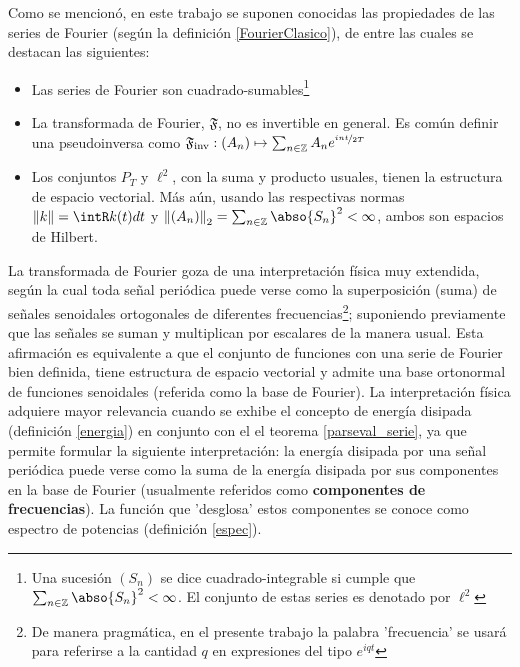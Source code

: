 Como se mencion\'o, en este trabajo se suponen conocidas las propiedades de las series de Fourier 
(seg\'un la definici\'on \ref{FourierClasico}), de entre las cuales se destacan las siguientes:
\begin{itemize}
\item Las series de Fourier  son cuadrado-sumables\footnote{Una sucesi\'on $\left( S_n \right)$ se 
dice cuadrado-integrable si cumple que $\sum_{n\in \mathbb{Z}} \abso{S_n}^{2} < \infty$. El 
conjunto de estas series es denotado por $\ell^{2}$}

\item La transformada de Fourier, $\mathfrak{F}$, no es invertible en general. Es com\'un definir
una pseudoinversa como 
$\mathfrak{F}_{\text{inv}} 
: \left( A_n \right) \mapsto \sum_{n \in \mathbb{Z}} A_n e^{\nicefrac{i n t}{2 T}} $

\item Los conjuntos $P_T$ y $\ell^{2}$, con la suma y producto usuales, tienen la estructura de 
espacio vectorial. M\'as a\'un, usando las respectivas normas $\Vert k \Vert = \intR k(t) dt$ y 
$\left\Vert \left( A_n \right) \right\Vert_2 = \sum_{n\in \mathbb{Z}} \abso{S_n}^{2} < \infty$,
ambos son espacios de Hilbert.
\end{itemize}

La transformada de Fourier goza de una interpretaci\'on f\'isica muy extendida, seg\'un la cual 
toda se\~nal peri\'odica puede verse como la superposici\'on (suma) de se\~nales senoidales 
ortogonales de diferentes frecuencias\footnote{De manera pragm\'atica, en el presente trabajo la 
palabra  'frecuencia' se usar\'a para referirse a la cantidad $q$ en expresiones del tipo 
$e^{i q t}$}; suponiendo previamente que las se\~nales se suman y multiplican por escalares de la 
manera usual. 
Esta afirmaci\'on es equivalente a que el conjunto de funciones con una serie de Fourier bien 
definida, tiene estructura de espacio vectorial y admite una base ortonormal de funciones 
senoidales (referida como la base de Fourier). 
La interpretaci\'on f\'isica adquiere mayor relevancia cuando se exhibe el concepto de energ\'ia
disipada (definici\'on \ref{energia}) en conjunto con el el teorema \ref{parseval_serie}, ya que 
permite formular la siguiente interpretaci\'on: la energ\'ia disipada por una se\~nal peri\'odica 
puede verse como la suma de la energ\'ia disipada por sus componentes en la base de Fourier 
(usualmente referidos como \textbf{componentes de frecuencias}).
La funci\'on que 'desglosa' estos componentes se conoce como espectro de potencias (definici\'on 
\ref{espec}). 

